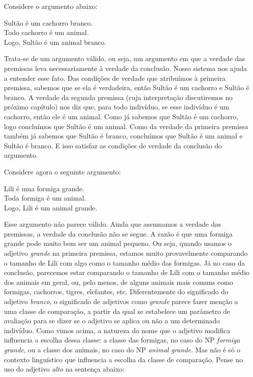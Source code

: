 Considere o argumento abaixo:

\begin{exe}
\ex Sultão é um cachorro branco.\\
Todo cachorro é um animal.\\
Logo, Sultão é um animal branco.
\end{exe}

\n Trata-se de um argumento válido, ou seja, um argumento em que a
verdade das premissas leva necessariamente à verdade da conclusão.
Nosso sistema nos ajuda a entender esse fato. Das condições de
verdade que atribuímos à primeira premissa, sabemos que se ela é
verdadeira, então Sultão é um cachorro e Sultão é branco. A
verdade da segunda premissa (cuja interpretação discutiremos no
próximo capítulo) nos diz que, para todo indivíduo, se esse
indivíduo é um cachorro, então ele é um animal. Como já sabemos
que Sultão é um cachorro, logo concluímos que Sultão é um animal.
Como da verdade da primeira premissa também já sabemos que Sultão
é branco, concluímos que Sultão é um animal e Sultão é branco. E
isso satisfaz as condições de verdade da conclusão
do argumento.

Considere agora o seguinte argumento:

\begin{exe}
\ex\label{nueba} Lili é uma formiga grande.\\
Toda formiga é um animal.\\
Logo, Lili é um animal grande.
\end{exe}

\n Esse argumento não parece válido. Ainda que assumamos a verdade
das premissas, a verdade da conclusão não se segue. A razão é que
uma formiga grande pode muito bem ser um animal pequeno. Ou seja,
quando usamos o adjetivo \textit{grande} na primeira premissa,
estamos muito provavelmente comparando o tamanho de Lili com algo como o tamanho médio
das formigas. Já no caso da conclusão, parecemos estar comparando
o tamanho de Lili com o tamanho  médio dos animais em geral, ou,
pelo menos, de alguns animais mais comuns como formigas,
cachorros, tigres, elefantes, etc. Diferentemente do
significado do adjetivo \textit{branco}, o significado de
adjetivos como \textit{grande} parece fazer menção a uma classe de
comparação, a partir da qual se estabelece um parâmetro de
avaliação para se dizer se o adjetivo se aplica ou não a um
determinado indivíduo. Como vimos acima, a natureza do nome que o
adjetivo modifica influencia a escolha dessa classe: a classe das
formigas, no caso do NP \textit{formiga grande}, ou a classe dos
animais, no caso do NP \textit{animal grande}. Mas não é só o
contexto linguístico que influencia a escolha da classe de
comparação. Pense no uso do adjetivo \textit{alto} na sentença
abaixo:

